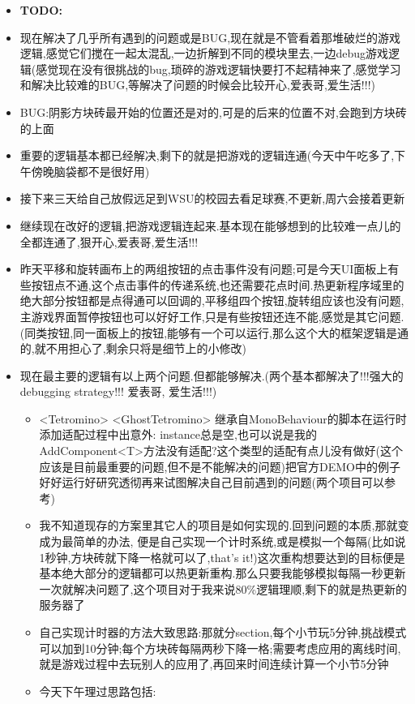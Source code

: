 \documentclass[9pt, b5paper]{article}
\begin{document}
\begin{itemize}
\item \textbf{TODO:}
\item 现在解决了几乎所有遇到的问题或是BUG,现在就是不管看着那堆破烂的游戏逻辑,感觉它们搅在一起太混乱,一边折解到不同的模块里去,一边debug游戏逻辑(感觉现在没有很挑战的bug,琐碎的游戏逻辑快要打不起精神来了,感觉学习和解决比较难的BUG,等解决了问题的时候会比较开心,爱表哥,爱生活!!!)
\item BUG:阴影方块砖最开始的位置还是对的,可是的后来的位置不对,会跑到方块砖的上面
\item 重要的逻辑基本都已经解决,剩下的就是把游戏的逻辑连通(今天中午吃多了,下午傍晚脑袋都不是很好用)
\item 接下来三天给自己放假远足到WSU的校园去看足球赛,不更新,周六会接着更新
\item 继续现在改好的逻辑,把游戏逻辑连起来.基本现在能够想到的比较难一点儿的全都连通了,狠开心,爱表哥,爱生活!!!
\item 昨天平移和旋转画布上的两组按钮的点击事件没有问题;可是今天UI面板上有些按钮点不通,这个点击事件的传递系统,也还需要花点时间.热更新程序域里的绝大部分按钮都是点得通可以回调的,平移组四个按钮,旋转组应该也没有问题,主游戏界面暂停按钮也可以好好工作,只是有些按钮还连不能,感觉是其它问题. (同类按钮,同一面板上的按钮,能够有一个可以运行,那么这个大的框架逻辑是通的,就不用担心了,剩余只将是细节上的小修改)
\item 现在最主要的逻辑有以上两个问题.但都能够解决.(两个基本都解决了!!!强大的debugging strategy!!! 爱表哥, 爱生活!!!)
\begin{itemize}
\item <Tetromino> <GhostTetromino> 继承自MonoBehaviour的脚本在运行时添加适配过程中出意外: instance总是空,也可以说是我的AddComponent<T>方法没有适配?这个类型的适配有点儿没有做好(这个应该是目前最重要的问题,但不是不能解决的问题)把官方DEMO中的例子好好运行好研究透彻再来试图解决自己目前遇到的问题(两个项目可以参考)
\item 我不知道现存的方案里其它人的项目是如何实现的.回到问题的本质,那就变成为最简单的办法, 便是自己实现一个计时系统,或是模拟一个每隔(比如说1秒钟,方块砖就下降一格就可以了,that's it!)这次重构想要达到的目标便是基本绝大部分的逻辑都可以热更新重构.那么只要我能够模拟每隔一秒更新一次就解决问题了,这个项目对于我来说80\%逻辑理顺,剩下的就是热更新的服务器了
\item 自己实现计时器的方法大致思路:那就分section,每个小节玩5分钟,挑战模式可以加到10分钟;每个方块砖每隔两秒下降一格;需要考虑应用的离线时间,就是游戏过程中去玩别人的应用了,再回来时间连续计算一个小节5分钟
\item 今天下午理过思路包括:

\end{itemize}
\end{itemize}
\end{document}

